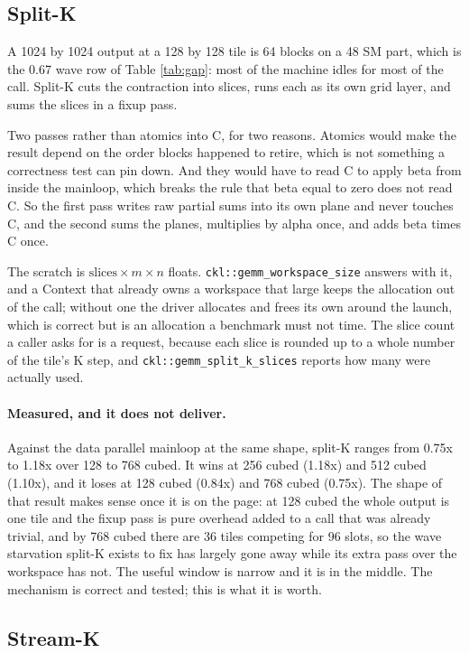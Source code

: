 \subsection{Split-K}

A 1024 by 1024 output at a 128 by 128 tile is 64 blocks on a 48 SM part, which is
the 0.67 wave row of Table \ref{tab:gap}: most of the machine idles for most of
the call. Split-K cuts the contraction into slices, runs each as its own grid
layer, and sums the slices in a fixup pass.

Two passes rather than atomics into C, for two reasons. Atomics would make the
result depend on the order blocks happened to retire, which is not something a
correctness test can pin down. And they would have to read C to apply beta from
inside the mainloop, which breaks the rule that beta equal to zero does not read
C. So the first pass writes raw partial sums into its own plane and never touches
C, and the second sums the planes, multiplies by alpha once, and adds beta times C
once.

The scratch is $\text{slices} \times m \times n$ floats.
\texttt{ckl::gemm\_workspace\_size} answers with it, and a Context that already
owns a workspace that large keeps the allocation out of the call; without one the
driver allocates and frees its own around the launch, which is correct but is an
allocation a benchmark must not time. The slice count a caller asks for is a
request, because each slice is rounded up to a whole number of the tile's K step,
and \texttt{ckl::gemm\_split\_k\_slices} reports how many were actually used.

\paragraph{Measured, and it does not deliver.} Against the data parallel mainloop
at the same shape, split-K ranges from 0.75x to 1.18x over 128 to 768 cubed. It
wins at 256 cubed (1.18x) and 512 cubed (1.10x), and it loses at 128 cubed (0.84x)
and 768 cubed (0.75x). The shape of that result makes sense once it is on the page:
at 128 cubed the whole output is one tile and the fixup pass is pure overhead added
to a call that was already trivial, and by 768 cubed there are 36 tiles competing
for 96 slots, so the wave starvation split-K exists to fix has largely gone away
while its extra pass over the workspace has not. The useful window is narrow and it
is in the middle. The mechanism is correct and tested; this is what it is worth.

\subsection{Stream-K}

